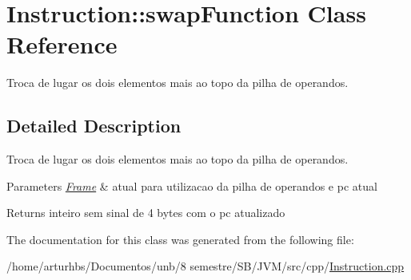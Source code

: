 \hypertarget{classInstruction_1_1swapFunction}{}\section{Instruction\+:\+:swap\+Function Class Reference}
\label{classInstruction_1_1swapFunction}


Troca de lugar os dois elementos mais ao topo da pilha de operandos.  




\subsection{Detailed Description}
Troca de lugar os dois elementos mais ao topo da pilha de operandos. 


\begin{DoxyParams}{Parameters}
{\em \hyperlink{classFrame}{Frame}} & atual para utilizacao da pilha de operandos e pc atual \\
\hline
\end{DoxyParams}
\begin{DoxyReturn}{Returns}
inteiro sem sinal de 4 bytes com o pc atualizado 
\end{DoxyReturn}


The documentation for this class was generated from the following file\+:\begin{DoxyCompactItemize}
\item 
/home/arturhbs/\+Documentos/unb/8 semestre/\+S\+B/\+J\+V\+M/src/cpp/\hyperlink{Instruction_8cpp}{Instruction.\+cpp}\end{DoxyCompactItemize}
